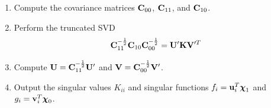 \documentclass[aspectratio=169, usenames, dvipsnames]{beamer}
\begin{document}
\begin{frame}
  \vfill

  \begin{enumerate}
  \item Compute the covariance matrices $\vb{C}_{00}$, $\vb{C}_{11}$, and $\vb{C}_{10}$.
    \bigskip
  \item Perform the truncated SVD
    \[
      \vb{C}_{11}^{-\frac12} \vb{C}_{10} \vb{C}_{00}^{-\frac12} = \vb{U}^{\prime} \vb{K} \vb{V}^{\prime T}
    \]

    \medskip
  \item Compute $\vb{U} = \vb{C}_{11}^{-\frac12} \vb{U}^{\prime}$ and $\vb{V} = \vb{C}_{00}^{-\frac12} \vb{V}^{\prime}$.
    \bigskip
  \item Output the singular values $K_{ii}$ and singular functions $f_i = \vb{u}_i^T \boldsymbol{\chi}_1$ and $g_i = \vb{v}_i^T \boldsymbol{\chi}_0$.
  \end{enumerate}

  \vfill
\end{frame}
\end{document}
